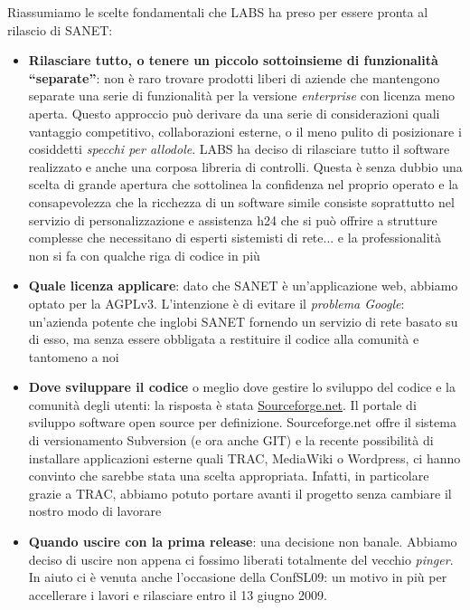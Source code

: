 \documentclass[a4wide,10pt,italian]{manual}
\begin{document}
Riassumiamo le scelte fondamentali che LABS ha preso per essere pronta al rilascio di SANET:
\begin{itemize}
\item {} 
\textbf{Rilasciare tutto, o tenere un piccolo sottoinsieme di funzionalità ``separate''}:
non è raro trovare prodotti liberi di aziende che mantengono separate una serie di funzionalità
per la versione \emph{enterprise} con licenza meno aperta. Questo approccio può derivare da una serie di
considerazioni quali vantaggio competitivo, collaborazioni esterne, o il meno pulito di posizionare
i cosiddetti \emph{specchi per allodole}. LABS ha deciso di rilasciare tutto il software realizzato e anche
una corposa libreria di controlli. Questa è senza dubbio una scelta di grande apertura che sottolinea
la confidenza nel proprio operato e la consapevolezza che la ricchezza di un software simile consiste
soprattutto nel servizio di personalizzazione e assistenza h24 che si può offrire a strutture complesse
che necessitano di esperti sistemisti di rete... e la professionalità non si fa
con qualche riga di codice in più

\item {} 
\textbf{Quale licenza applicare}: dato che SANET è un'applicazione web, abbiamo optato per la AGPLv3.
L'intenzione è di evitare il \emph{problema Google}: un'azienda potente che inglobi SANET fornendo
un servizio di rete basato su di esso, ma senza essere obbligata a restituire il codice alla comunità
e tantomeno a noi

\item {} 
\textbf{Dove sviluppare il codice} o meglio dove gestire lo sviluppo del codice e la comunità degli utenti:
la risposta è stata \href{http://sanet.sourceforge.net}{Sourceforge.net}. Il portale di sviluppo software open source per definizione.
Sourceforge.net offre il sistema di versionamento Subversion (e ora anche GIT) e la recente possibilità di installare applicazioni esterne quali TRAC, MediaWiki o Wordpress, ci hanno convinto che sarebbe stata una scelta appropriata.
Infatti, in particolare grazie a TRAC, abbiamo potuto portare avanti il progetto senza cambiare il nostro modo di lavorare

\item {} 
\textbf{Quando uscire con la prima release}: una decisione non banale. Abbiamo deciso di uscire non appena
ci fossimo liberati totalmente del vecchio \emph{pinger}. In aiuto ci è venuta anche l'occasione della ConfSL09: un motivo in più per accellerare i lavori e rilasciare entro il 13 giugno 2009.

\end{itemize}
\end{document}
